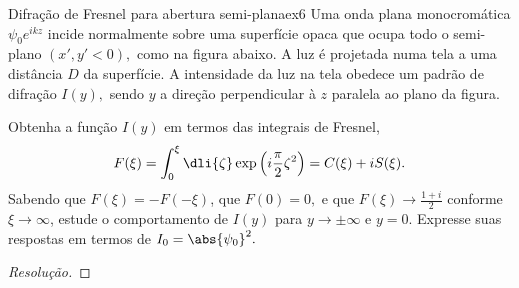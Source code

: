 \begin{exercício}{Difração de Fresnel para abertura semi-plana}{ex6}
    Uma onda plana monocromática \(\psi_0 e^{ikz}\) incide normalmente sobre uma superfície opaca que ocupa todo o semi-plano \((x', y' < 0),\) como na figura abaixo. A luz é projetada numa tela a uma distância \(D\) da superfície. A intensidade da luz na tela obedece um padrão de difração \(I(y),\) sendo \(y\) a direção perpendicular à \(z\) paralela ao plano da figura.
    \begin{center}
    \end{center}
    Obtenha a função \(I(y)\) em termos das integrais de Fresnel,
    \begin{equation*}
        F(\xi) = \int_0^\xi \dli{\zeta} \exp\left(i\frac{\pi}{2} \zeta^2\right) = C(\xi) + i S(\xi).
    \end{equation*}
    Sabendo que \(F(\xi) = - F(-\xi)\), que \(F(0) = 0,\) e que \(F(\xi) \to \frac{1 + i}{2}\) conforme \(\xi \to \infty\), estude o comportamento de \(I(y)\) para \(y \to \pm \infty\) e \(y = 0\). Expresse suas respostas em termos de \(I_0 = \abs{\psi_0}^2.\)
\end{exercício}
\begin{proof}[Resolução]
    
\end{proof}
